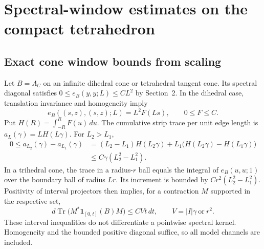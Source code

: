 \documentclass[11pt]{amsart}
\numberwithin{equation}{section}
\theoremstyle{remark}
\newcommand{\Tr}{\operatorname{Tr}}
\newcommand{\one}{\mathbf{1}}
\begin{document}
\section{Spectral-window estimates on the compact tetrahedron}

\subsection{Exact cone window bounds from scaling}
Let $B=\Lambda_C$ on an infinite dihedral cone or tetrahedral tangent cone. Its spectral diagonal satisfies $0\le e_B(y,y;L)\le CL^2$ by Section~2. In the dihedral case, translation invariance and homogeneity imply
\begin{equation}\label{eq:scaling}
e_B((s,z),(s,z);L)=L^2F(Ls),\qquad 0\le F\le C .
\end{equation}
Put $H(R)=\int_{-R}^RF(u)\,du$. The cumulative strip trace per unit edge length is $a_L(\gamma)=LH(L\gamma)$. For $L_2>L_1$,
\begin{equation}\label{eq:stripincrement}
\begin{aligned}
0\le a_{L_2}(\gamma)-a_{L_1}(\gamma)&=(L_2-L_1)H(L_2\gamma)+L_1\big(H(L_2\gamma)-H(L_1\gamma)\big)\\
&\le C\gamma(L_2^2-L_1^2) .
\end{aligned}
\end{equation}
In a trihedral cone, the trace in a radius-$r$ ball equals the integral of $e_B(u,u;1)$ over the boundary ball of radius $Lr$. Its increment is bounded by $Cr^2(L_2^2-L_1^2)$. Positivity of interval projectors then implies, for a contraction $M$ supported in the respective set,
\begin{equation}\label{eq:dtrace}
d\Tr\big(M^*\one_{[0,t]}(B)M\big)\le CVt\,dt,\qquad V=|I|\gamma\ \text{or}\ r^2 .
\end{equation}
These interval inequalities do not differentiate a pointwise spectral kernel. Homogeneity and the bounded positive diagonal suffice, so all model channels are included.
\end{document}
